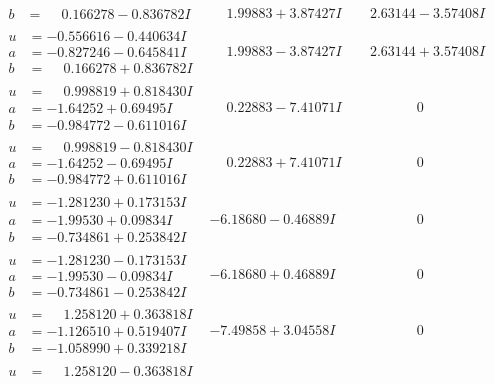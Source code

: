 \documentclass[1p]{elsarticle_modified}
\theoremstyle{definition}
\begin{document}
$$\begin{array}{c|c|c}
\begin{aligned}
b &= \phantom{-}0.166278 - 0.836782 I\end{aligned}
 & \phantom{-}1.99883 + 3.87427 I & \phantom{-}2.63144 - 3.57408 I \\ \hline\begin{aligned}
u &= -0.556616 - 0.440634 I \\
a &= -0.827246 - 0.645841 I \\
b &= \phantom{-}0.166278 + 0.836782 I\end{aligned}
 & \phantom{-}1.99883 - 3.87427 I & \phantom{-}2.63144 + 3.57408 I \\ \hline\begin{aligned}
u &= \phantom{-}0.998819 + 0.818430 I \\
a &= -1.64252 + 0.69495 I \\
b &= -0.984772 - 0.611016 I\end{aligned}
 & \phantom{-}0.22883 - 7.41071 I & \phantom{-0.000000 } 0 \\ \hline\begin{aligned}
u &= \phantom{-}0.998819 - 0.818430 I \\
a &= -1.64252 - 0.69495 I \\
b &= -0.984772 + 0.611016 I\end{aligned}
 & \phantom{-}0.22883 + 7.41071 I & \phantom{-0.000000 } 0 \\ \hline\begin{aligned}
u &= -1.281230 + 0.173153 I \\
a &= -1.99530 + 0.09834 I \\
b &= -0.734861 + 0.253842 I\end{aligned}
 & -6.18680 - 0.46889 I & \phantom{-0.000000 } 0 \\ \hline\begin{aligned}
u &= -1.281230 - 0.173153 I \\
a &= -1.99530 - 0.09834 I \\
b &= -0.734861 - 0.253842 I\end{aligned}
 & -6.18680 + 0.46889 I & \phantom{-0.000000 } 0 \\ \hline\begin{aligned}
u &= \phantom{-}1.258120 + 0.363818 I \\
a &= -1.126510 + 0.519407 I \\
b &= -1.058990 + 0.339218 I\end{aligned}
 & -7.49858 + 3.04558 I & \phantom{-0.000000 } 0 \\ \hline\begin{aligned}
u &= \phantom{-}1.258120 - 0.363818 I \\

\end{aligned}
\end{array}$$
\end{document}
